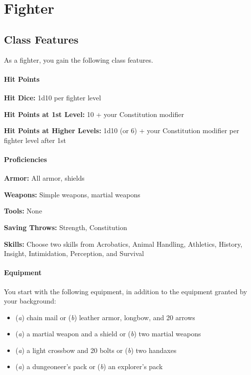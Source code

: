 \documentclass[
]{article}
\date{}
\providecommand{\tightlist}{%
  \setlength{\itemsep}{0pt}\setlength{\parskip}{0pt}}
\begin{document}
\hypertarget{fighter}{%
\section{Fighter}\label{fighter}}

\hypertarget{class-features}{%
\subsection{Class Features}\label{class-features}}

As a fighter, you gain the following class features.

\hypertarget{hit-points}{%
\paragraph{Hit Points}\label{hit-points}}

\textbf{Hit Dice:} 1d10 per fighter level

\textbf{Hit Points at 1st Level:} 10 + your Constitution modifier

\textbf{Hit Points at Higher Levels:} 1d10 (or 6) + your Constitution
modifier per fighter level after 1st

\hypertarget{proficiencies}{%
\paragraph{Proficiencies}\label{proficiencies}}

\textbf{Armor:} All armor, shields

\textbf{Weapons:} Simple weapons, martial weapons

\textbf{Tools:} None

\textbf{Saving Throws:} Strength, Constitution

\textbf{Skills:} Choose two skills from Acrobatics, Animal Handling,
Athletics, History, Insight, Intimidation, Perception, and Survival

\hypertarget{equipment}{%
\paragraph{Equipment}\label{equipment}}

You start with the following equipment, in addition to the equipment
granted by your background:

\begin{itemize}
\tightlist
\item
  (\emph{a}) chain mail or (\emph{b}) leather armor, longbow, and 20
  arrows
\item
  (\emph{a}) a martial weapon and a shield or (\emph{b}) two martial
  weapons
\item
  (\emph{a}) a light crossbow and 20 bolts or (\emph{b}) two handaxes
\item
  (\emph{a}) a dungeoneer's pack or (\emph{b}) an explorer's pack
\end{itemize}
\end{document}
